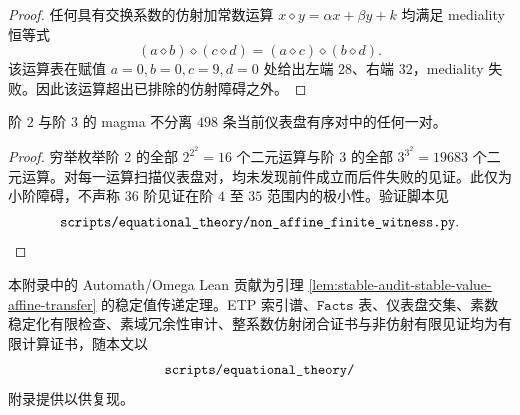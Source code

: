 \documentclass[../../main.tex]{subfiles}
\begin{document}
\begin{proof}
任何具有交换系数的仿射加常数运算 \(x\diamond y=\alpha x+\beta y+k\) 均满足 mediality 恒等式
\[
    (a\diamond b)\diamond(c\diamond d)=(a\diamond c)\diamond(b\diamond d).
\]
该运算表在赋值 \(a=0,b=0,c=9,d=0\) 处给出左端 \(28\)、右端 \(32\)，mediality 失败。因此该运算超出已排除的仿射障碍之外。
\end{proof}

\begin{proposition}[小阶有限障碍]\label{prop:stable-audit-small-order-obstruction}
阶 \(2\) 与阶 \(3\) 的 magma 不分离 \(498\) 条当前仪表盘有序对中的任何一对。
\end{proposition}

\begin{proof}
穷举枚举阶 \(2\) 的全部 \(2^{2^2}=16\) 个二元运算与阶 \(3\) 的全部 \(3^{3^2}=19683\) 个二元运算。对每一运算扫描仪表盘对，均未发现前件成立而后件失败的见证。此仅为小阶障碍，不声称 \(36\) 阶见证在阶 \(4\) 至 \(35\) 范围内的极小性。验证脚本见
\[
    \texttt{\detokenize{scripts/equational_theory/non_affine_finite_witness.py}}.
\]
\end{proof}

\begin{remark}[证书边界]\label{rem:stable-audit-certificate-boundary}
本附录中的 Automath/Omega Lean 贡献为引理 \ref{lem:stable-audit-stable-value-affine-transfer} 的稳定值传递定理。ETP 索引谱、\(\texttt{Facts}\) 表、仪表盘交集、素数稳定化有限检查、素域冗余性审计、整系数仿射闭合证书与非仿射有限见证均为有限计算证书，随本文以
\[
    \texttt{\detokenize{scripts/equational_theory/}}
\]
附录提供以供复现。
\end{remark}
\end{document}
